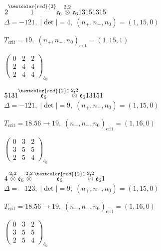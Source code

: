 \documentclass[10pt]{article}
\begin{document}
\smallskip

$2\overset{\textcolor{red}{2}}{1}\mathfrak{e}_6\overset{2,2}{\otimes}\mathfrak{e}_613151315$ \quad $\Delta=-121,\; |\det|=4,\; (n_+,n_-,n_0)=(1,15,0)$

\hspace{1em}$T_{\text{crit}}=19,\; (n_+,n_-,n_0)_{\text{crit}}=(1,15,1)$

\hspace{2em}$\left(\begin{smallmatrix}0 & 2 & 2 \\ 2 & 4 & 4 \\ 2 & 4 & 4\end{smallmatrix}\right)_{\!b_0}$

\smallskip

$5131\overset{\textcolor{red}{2}1}{\mathfrak{e}_6}\overset{2,2}{\otimes}\mathfrak{e}_613151$ \quad $\Delta=-121,\; |\det|=9,\; (n_+,n_-,n_0)=(1,15,0)$

\hspace{1em}$T_{\text{crit}}=18.56 \to 19,\; (n_+,n_-,n_0)_{\text{crit}}=(1,16,0)$

\hspace{2em}$\left(\begin{smallmatrix}0 & 3 & 2 \\ 3 & 5 & 5 \\ 2 & 5 & 4\end{smallmatrix}\right)_{\!b_0}$

\smallskip

$4\overset{2,2}{\otimes}\mathfrak{e}_6\overset{2,2}{\otimes}\overset{\textcolor{red}{2}1}{\mathfrak{e}_6}\overset{2,2}{\otimes}\mathfrak{e}_61$ \quad $\Delta=-123,\; |\det|=9,\; (n_+,n_-,n_0)=(1,15,0)$

\hspace{1em}$T_{\text{crit}}=18.56 \to 19,\; (n_+,n_-,n_0)_{\text{crit}}=(1,16,0)$

\hspace{2em}$\left(\begin{smallmatrix}0 & 3 & 2 \\ 3 & 5 & 5 \\ 2 & 5 & 4\end{smallmatrix}\right)_{\!b_0}$
\end{document}
